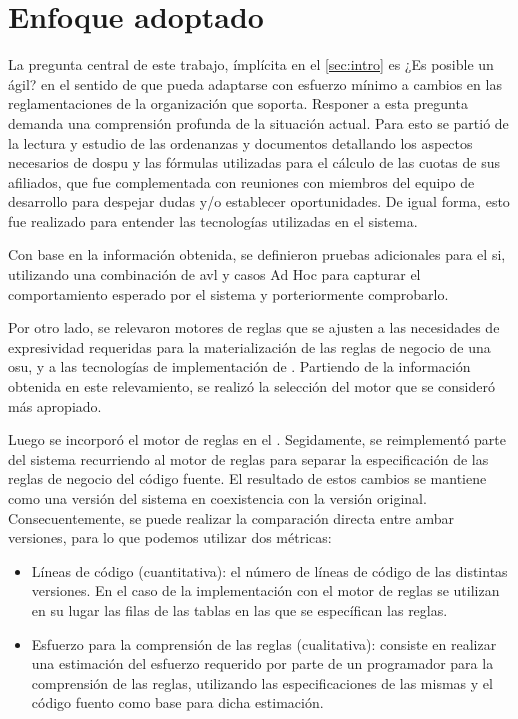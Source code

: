 \section{Enfoque adoptado}
La pregunta central de este trabajo, ímplícita en el \cref{sec:intro} es ¿Es
posible un {\SIOSU} ágil? en el sentido de que pueda adaptarse con esfuerzo mínimo a
cambios en las reglamentaciones de la organización que soporta. Responer a esta pregunta demanda una comprensión profunda de la situación actual.
Para esto se partió de la lectura y estudio de las ordenanzas y documentos detallando los aspectos necesarios de \acrshort{dospu} y las fórmulas utilizadas para el cálculo de las cuotas de sus afiliados, que fue complementada con reuniones con miembros del equipo de desarrollo {\SIDOSPU} para despejar dudas y/o establecer oportunidades. De igual forma, esto fue realizado para entender las tecnologías utilizadas en el sistema.

Con base en la información obtenida, se definieron pruebas adicionales para el \acrshort{si}, utilizando una combinación de \acrfull{avl} y casos Ad Hoc para capturar el comportamiento esperado por el sistema y porteriormente comprobarlo.

Por otro lado, se relevaron motores de reglas que se ajusten a las necesidades de expresividad requeridas para la materialización de las reglas de negocio de una \acrshort{osu}, y a las tecnologías de implementación de {\SIDOSPU}. Partiendo de la información obtenida en este relevamiento, se realizó la selección del motor que se consideró más apropiado.

Luego se incorporó el motor de reglas en el {\SIDOSPU}. Segidamente, se reimplementó parte del sistema recurriendo al motor de reglas para separar la especificación de las reglas de negocio del código fuente. El resultado de estos cambios se mantiene como una versión del sistema en coexistencia con la versión original. Consecuentemente, se puede realizar la comparación directa entre ambar versiones, para lo que podemos utilizar dos métricas:
\begin{itemize}
    \item Líneas de código (cuantitativa): el número de líneas de código de las distintas versiones. En el caso de la implementación con el motor de reglas se utilizan en su lugar las filas de las tablas en las que se específican las reglas.
    \item Esfuerzo para la comprensión de las reglas (cualitativa): consiste en realizar una estimación del esfuerzo requerido por parte de un programador para la comprensión de las reglas, utilizando las especificaciones de las mismas y el código fuento como base para dicha estimación.
\end{itemize}
